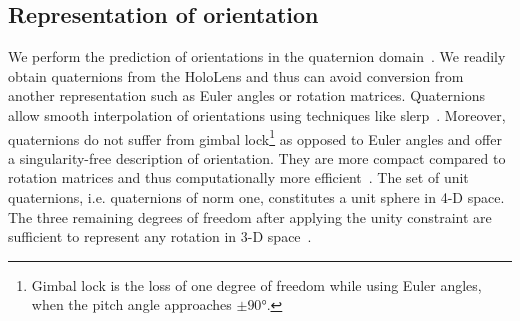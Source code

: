\documentclass[sigconf]{acmart}			%
\begin{document}
\subsection{Representation of orientation}
\label{sec:orientation}
We perform the prediction of orientations in the quaternion domain~\cite{diebel2006}. 
We readily obtain quaternions from the HoloLens and thus can avoid conversion from another representation such as Euler angles or rotation matrices.
Quaternions allow smooth interpolation of orientations using techniques like \gls{slerp}~\cite{shoemake1985}. 
Moreover, quaternions do not suffer from gimbal lock\footnote{Gimbal lock is the loss of one degree of freedom while using Euler angles, when the pitch angle approaches $\pm \ang{90}$.} as opposed to Euler angles and offer a singularity-free description of orientation.
They are more compact compared to rotation matrices and thus computationally more efficient~\cite{jia2013}. 
The set of unit quaternions, i.e. quaternions of norm one, constitutes a unit sphere in 4-D space. 
The three remaining degrees of freedom after applying the unity constraint are sufficient to represent any rotation in 3-D space~\cite{diebel2006}.
\end{document}

